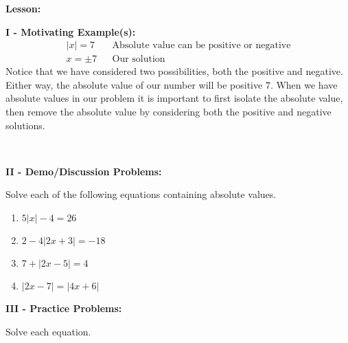 \documentclass[12pt]{article}
\theoremstyle{definition}
\begin{document}
{\bf Lesson:}
\par
{\bf I - Motivating Example(s):}
  \begin{eqnarray*}
    |x| = 7 &  & \text{Absolute value can be positive or negative}\\
    x = \pm 7 &  & \text{Our solution}
  \end{eqnarray*}
Notice that we have considered two possibilities, both the positive and negative. Either way, the absolute value of our number will be positive $7$.  When we have absolute values in our problem it is important to first isolate the absolute value, then remove the absolute value by considering both the positive and negative solutions.\par
\ \par
{\bf II - Demo/Discussion Problems:}\\
\par
Solve each of the following equations containing absolute values.
\begin{enumerate}
	\item $5|x|-4=26$\\
	\item $2-4|2x+3|=-18$\\
	\item $7+|2x-5|=4$\\
	\item $|2x-7|=|4x+6|$
\end{enumerate}
\newpage
{\bf III - Practice Problems:}\\
\par
Solve each equation.
\par
\end{document}
